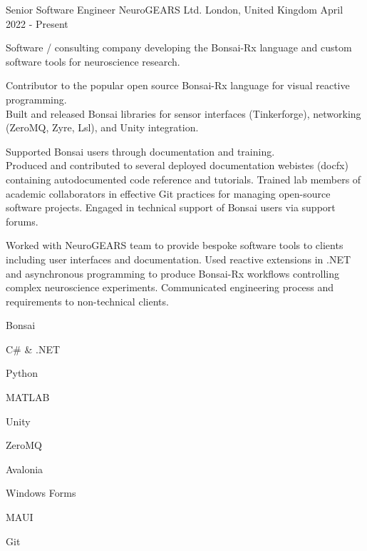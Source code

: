 

\begin{cventries}

  \cventry%
    {Senior Software Engineer} %
    {NeuroGEARS Ltd.} %
    {London, United Kingdom} %
    {April 2022 \-- Present} %
    {
      \begin{cvsentence}Software / consulting company developing the Bonsai-Rx language and custom software tools for neuroscience research.\end{cvsentence}
      \begin{cvitems} %
        \item {Contributor to the popular open source Bonsai-Rx language for visual reactive programming.} \\
        Built and released Bonsai libraries for sensor interfaces (Tinkerforge), networking (ZeroMQ, Zyre, Lsl), and Unity integration.
        \item {Supported Bonsai users through documentation and training.} \\
        Produced and contributed to several deployed documentation webistes (docfx) containing autodocumented code reference and tutorials. Trained lab members of academic collaborators in effective Git practices for managing open-source software projects. Engaged in technical support of Bonsai users via support forums.
        \item {Worked with NeuroGEARS team to provide bespoke software tools to clients including user interfaces and documentation. Used reactive extensions in .NET and asynchronous programming to produce Bonsai-Rx workflows controlling complex neuroscience experiments. Communicated engineering process and requirements to non-technical clients.}
      \end{cvitems}
    }
    \begin{cventryskills}
      \item Bonsai
      \item C\# \& .NET
      \item Python
      \item MATLAB
      \item Unity
      \item ZeroMQ
      \item Avalonia
      \item Windows Forms
      \item MAUI
      \item Git
    \end{cventryskills}


\end{cventries}
